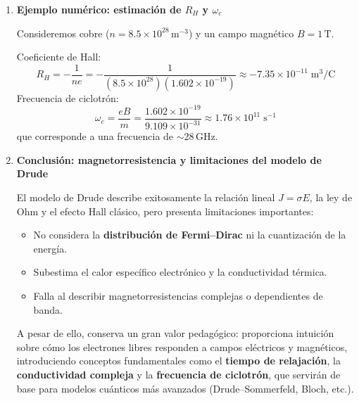 \documentclass{article}
\begin{document}
\begin{enumerate}[label=\textbf{Actividad \arabic*.}, leftmargin=*]
Esta es la \textbf{frecuencia de ciclotrón}.  
En metales, la combinación de colisiones (tiempo \(\tau\)) con esta rotación da lugar a fenómenos de magnetorresistencia y resonancia ciclotrónica.

\item \textbf{Ejemplo numérico: estimación de \(R_H\) y \(\omega_c\)}

Consideremos cobre (\(n=8.5\times10^{28}\,\mathrm{m^{-3}}\)) y un campo magnético \(B=1\,\mathrm{T}\).

\medskip
Coeficiente de Hall:
\[
R_H = -\frac{1}{n e}
= -\frac{1}{(8.5\times10^{28})(1.602\times10^{-19})}
\approx -7.35\times10^{-11}\;\mathrm{m^{3}/C}
\]
Frecuencia de ciclotrón:
\[
\omega_c = \frac{eB}{m}
= \frac{1.602\times10^{-19}}{9.109\times10^{-31}}
\approx 1.76\times10^{11}\;\mathrm{s^{-1}}
\]
que corresponde a una frecuencia de \(\sim 28\,\mathrm{GHz}\).

\item \textbf{Conclusión: magnetorresistencia y limitaciones del modelo de Drude}

El modelo de Drude describe exitosamente la relación lineal \(J=\sigma E\), la ley de Ohm y el efecto Hall clásico, pero presenta limitaciones importantes:

\begin{itemize}
\item No considera la \textbf{distribución de Fermi–Dirac} ni la cuantización de la energía.
\item Subestima el calor específico electrónico y la conductividad térmica.
\item Falla al describir magnetorresistencias complejas o dependientes de banda.
\end{itemize}

A pesar de ello, conserva un gran valor pedagógico: proporciona intuición sobre cómo los electrones libres responden a campos eléctricos y magnéticos, introduciendo conceptos fundamentales como el \textbf{tiempo de relajación}, la \textbf{conductividad compleja} y la \textbf{frecuencia de ciclotrón}, que servirán de base para modelos cuánticos más avanzados (Drude–Sommerfeld, Bloch, etc.).

\end{enumerate}
\end{document}
